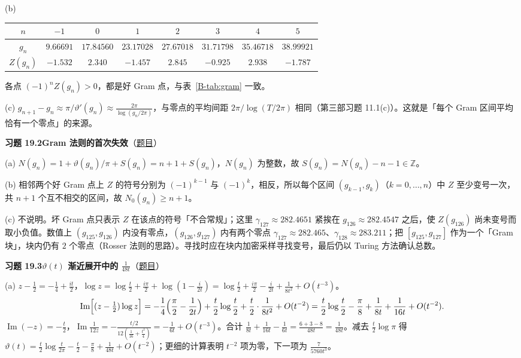 \documentclass[11pt,a4paper]{article}
\renewcommand{\Im}{\operatorname{Im}}
\newcommand{\bref}[1]{\ref*{B-#1}}
\newcommand{\Sol}[2]{%
  \par\addvspace{1.2em}\noindent
  \hypertarget{s:#1}{}\textbf{习题 #1\quad #2}\hfill{\small（\hyperlink{q:#1}{题目}）}\par
  \nopagebreak\smallskip}
\begin{document}
(b)
\begin{center}
\small
\begin{tabular}{@{}cccccccc@{}}
\toprule
$n$ & $-1$ & $0$ & $1$ & $2$ & $3$ & $4$ & $5$ \\
\midrule
$g_n$ & $9.66691$ & $17.84560$ & $23.17028$ & $27.67018$ & $31.71798$ & $35.46718$ & $38.99921$ \\
$Z(g_n)$ & $-1.532$ & $2.340$ & $-1.457$ & $2.845$ & $-0.925$ & $2.938$ & $-1.787$ \\
\bottomrule
\end{tabular}
\end{center}
各点 $(-1)^nZ(g_n)>0$，都是好 Gram 点，与表~\bref{tab:gram} 一致。

(c) $g_{n+1}-g_n\approx\pi/\vartheta'(g_n)\approx\frac{2\pi}{\log(g_n/2\pi)}$，与零点的平均间距 $2\pi/\log(T/2\pi)$ 相同（第三部习题 11.1(c)）。这就是「每个 Gram 区间平均恰有一个零点」的来源。

\Sol{19.2}{Gram 法则的首次失效}
(a) $N(g_n)=1+\vartheta(g_n)/\pi+S(g_n)=n+1+S(g_n)$，$N(g_n)$ 为整数，故 $S(g_n)=N(g_n)-n-1\in\mathbb Z$。

(b) 相邻两个好 Gram 点上 $Z$ 的符号分别为 $(-1)^{k-1}$ 与 $(-1)^k$，相反，所以每个区间 $(g_{k-1},g_k)$（$k=0,\dots,n$）中 $Z$ 至少变号一次，共 $n+1$ 个互不相交的区间，故 $N_0(g_n)\ge n+1$。

(c) 不说明。坏 Gram 点只表示 $Z$ 在该点的符号「不合常规」；这里 $\gamma_{127}\approx282.4651$ 紧挨在 $g_{126}\approx282.4547$ 之后，使 $Z(g_{126})$ 尚未变号而取小负值。数值上 $(g_{125},g_{126})$ 内没有零点，$(g_{126},g_{127})$ 内有两个零点 $\gamma_{127}\approx282.465$、$\gamma_{128}\approx283.211$；把 $[g_{125},g_{127}]$ 作为一个「Gram 块」，块内仍有 $2$ 个零点（Rosser 法则的思路）。寻找时应在块内加密采样寻找变号，最后仍以 Turing 方法确认总数。

\Sol{19.3}{$\vartheta(t)$ 渐近展开中的 $\frac1{48t}$}
(a) $z-\frac12=-\frac14+\frac{it}2$，$\log z=\log\frac t2+\frac{i\pi}2+\log(1-\frac i{2t})=\log\frac t2+\frac{i\pi}2-\frac{i}{2t}+\frac1{8t^2}+O(t^{-3})$。
\[
  \Im\Bigl[(z-\tfrac12)\log z\Bigr]=-\frac14\Bigl(\frac\pi2-\frac1{2t}\Bigr)+\frac t2\log\frac t2+\frac t2\cdot\frac1{8t^2}+O(t^{-2})
  =\frac t2\log\frac t2-\frac\pi8+\frac1{8t}+\frac1{16t}+O(t^{-2}).
\]
$\Im(-z)=-\frac t2$，$\Im\frac1{12z}=-\frac{t/2}{12(\frac1{16}+\frac{t^2}4)}=-\frac1{6t}+O(t^{-3})$。合计 $\frac1{8t}+\frac1{16t}-\frac1{6t}=\frac{6+3-8}{48t}=\frac1{48t}$。减去 $\frac t2\log\pi$ 得 $\vartheta(t)=\frac t2\log\frac t{2\pi}-\frac t2-\frac\pi8+\frac1{48t}+O(t^{-2})$；更细的计算表明 $t^{-2}$ 项为零，下一项为 $\frac7{5760t^3}$。
\end{document}
